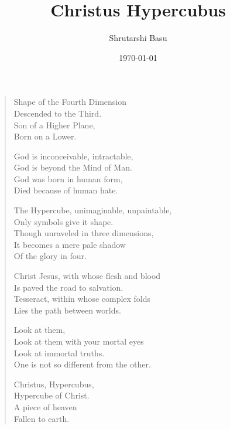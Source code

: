 \documentclass[12pt,letterpaper]{article}
\title{Christus Hypercubus}
\author{Shrutarshi Basu}
\date{\today}
\begin{document}
\maketitle
\begin{verse}
Shape of the Fourth Dimension\\
Descended to the Third.\\
Son of a Higher Plane,\\
Born on a Lower.

God is inconceivable, intractable,\\
God is beyond the Mind of Man.\\
God was born in human form,\\
Died because of human hate.

The Hypercube, unimaginable, unpaintable,\\
Only symbols give it shape.\\
Though unraveled in three dimensions,\\
It becomes a mere pale shadow \\
Of the glory in four.

Christ Jesus, with whose flesh and blood\\
Is paved the road to salvation.\\
Tesseract, within whose complex folds\\
Lies the path between worlds.

Look at them,\\
Look at them with your mortal eyes\\
Look at immortal truths.\\
One is not so different from the other.

Christus, Hypercubus,\\
Hypercube of Christ.\\
A piece of heaven\\
Fallen to earth.
\end{verse}

\end{document}
